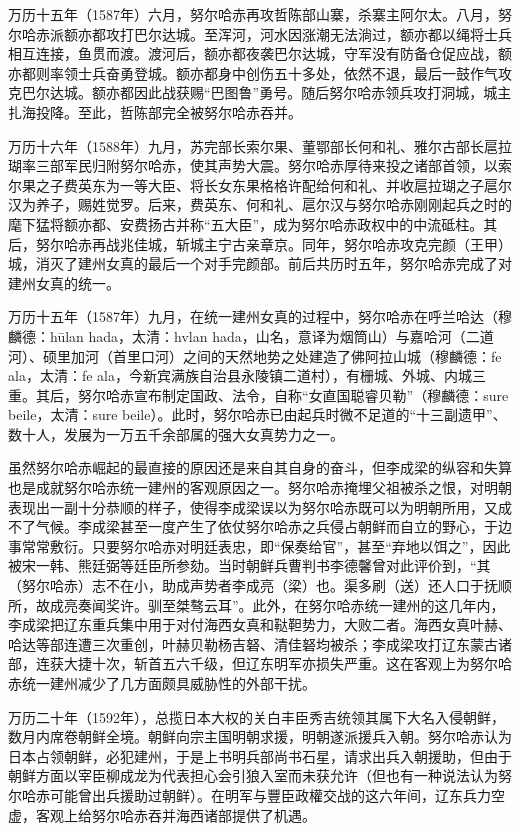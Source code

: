 万历十五年（1587年）六月，努尔哈赤再攻哲陈部山寨，杀寨主阿尔太。八月，努尔哈赤派额亦都攻打巴尔达城。至浑河，河水因涨潮无法淌过，额亦都以绳将士兵相互连接，鱼贯而渡。渡河后，额亦都夜袭巴尔达城，守军没有防备仓促应战，额亦都则率领士兵奋勇登城。额亦都身中创伤五十多处，依然不退，最后一鼓作气攻克巴尔达城。额亦都因此战获赐“巴图鲁”勇号。随后努尔哈赤领兵攻打洞城，城主扎海投降。至此，哲陈部完全被努尔哈赤吞并。

万历十六年（1588年）九月，苏完部长索尔果、董鄂部长何和礼、雅尔古部长扈拉瑚率三部军民归附努尔哈赤，使其声势大震。努尔哈赤厚待来投之诸部首领，以索尔果之子费英东为一等大臣、将长女东果格格许配给何和礼、并收扈拉瑚之子扈尔汉为养子，赐姓觉罗。后来，费英东、何和礼、扈尔汉与努尔哈赤刚刚起兵之时的麾下猛将额亦都、安费扬古并称“五大臣”，成为努尔哈赤政权中的中流砥柱。其后，努尔哈赤再战兆佳城，斩城主宁古亲章京。同年，努尔哈赤攻克完颜（王甲）城，消灭了建州女真的最后一个对手完颜部。前后共历时五年，努尔哈赤完成了对建州女真的统一。

万历十五年（1587年）九月，在统一建州女真的过程中，努尔哈赤在呼兰哈达（穆麟德：hūlan hada，太清：hvlan hada，山名，意译为烟筒山）与嘉哈河（二道河）、硕里加河（首里口河）之间的天然地势之处建造了佛阿拉山城（穆麟德：fe ala，太清：fe ala，今新宾满族自治县永陵镇二道村），有栅城、外城、内城三重。其后，努尔哈赤宣布制定国政、法令，自称“女直国聪睿贝勒”（穆麟德：sure beile，太清：sure beile）。此时，努尔哈赤已由起兵时微不足道的“十三副遗甲”、数十人，发展为一万五千余部属的强大女真势力之一。

虽然努尔哈赤崛起的最直接的原因还是来自其自身的奋斗，但李成梁的纵容和失算也是成就努尔哈赤统一建州的客观原因之一。努尔哈赤掩埋父祖被杀之恨，对明朝表现出一副十分恭顺的样子，使得李成梁误以为努尔哈赤既可以为明朝所用，又成不了气候。李成梁甚至一度产生了依仗努尔哈赤之兵侵占朝鲜而自立的野心，于边事常常敷衍。只要努尔哈赤对明廷表忠，即“保奏给官”，甚至“弃地以饵之”，因此被宋一韩、熊廷弼等廷臣所参劾。当时朝鲜兵曹判书李德馨曾对此评价到，“其（努尔哈赤）志不在小，助成声势者李成亮（梁）也。渠多刷（送）还人口于抚顺所，故成亮奏闻奖许。驯至桀骜云耳”。此外，在努尔哈赤统一建州的这几年内，李成梁把辽东重兵集中用于对付海西女真和鞑靼势力，大败二者。海西女真叶赫、哈达等部连遭三次重创，叶赫贝勒杨吉砮、清佳砮均被杀；李成梁攻打辽东蒙古诸部，连获大捷十次，斩首五六千级，但辽东明军亦损失严重。这在客观上为努尔哈赤统一建州减少了几方面颇具威胁性的外部干扰。

万历二十年（1592年），总揽日本大权的关白丰臣秀吉统领其属下大名入侵朝鲜，数月内席卷朝鲜全境。朝鲜向宗主国明朝求援，明朝遂派援兵入朝。努尔哈赤认为日本占领朝鲜，必犯建州，于是上书明兵部尚书石星，请求出兵入朝援助，但由于朝鲜方面以宰臣柳成龙为代表担心会引狼入室而未获允许（但也有一种说法认为努尔哈赤可能曾出兵援助过朝鲜）。在明军与豐臣政權交战的这六年间，辽东兵力空虚，客观上给努尔哈赤吞并海西诸部提供了机遇。

